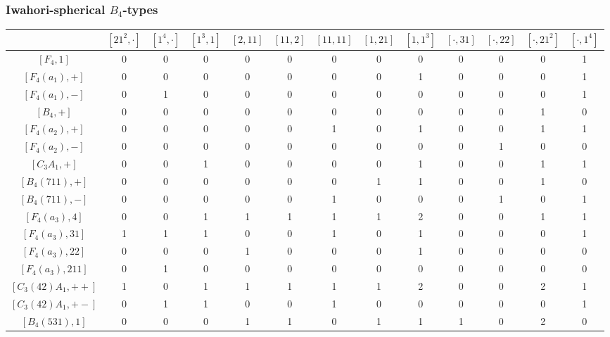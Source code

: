 \begin{landscape}
    \centering
    \subsubsection*{Iwahori-spherical \texorpdfstring{$B_4$}{PDFstring}-types}
    \begin{table}[ht]
        \centering
        {\small
        \begin{tabular}{|c|cccccccccccc|}
            \hline
            & $[21^2,\cdot]$ & $[1^4,\cdot]$ & $[1^3,1]$ & $[2,11]$ & $[11,2]$ & $[11,11]$ & $[1,21]$ & $[1,1^3]$ & $[\cdot,31]$ & $[\cdot,22]$ & $[\cdot,21^2]$ & $[\cdot,1^4]$ \\\hline
            $[F_4,1]$ & 0 & 0 & 0 & 0 & 0 & 0 & 0 & 0 & 0 & 0 & 0 & 1\\\hline
            $[F_4(a_1),+]$ & 0 & 0 & 0 & 0 & 0 & 0 & 0 & 1 & 0 & 0 & 0 & 1\\
            $[F_4(a_1),-]$ & 0 & 1 & 0 & 0 & 0 & 0 & 0 & 0 & 0 & 0 & 0 & 1\\
            $[B_4,+]$ & 0 & 0 & 0 & 0 & 0 & 0 & 0 & 0 & 0 & 0 & 1 & 0\\\hline
            $[F_4(a_2),+]$ & 0 & 0 & 0 & 0 & 0 & 1 & 0 & 1 & 0 & 0 & 1 & 1\\
            $[F_4(a_2),-]$ & 0 & 0 & 0 & 0 & 0 & 0 & 0 & 0 & 0 & 1 & 0 & 0\\
            $[C_3A_1,+]$ & 0 & 0 & 1 & 0 & 0 & 0 & 0 & 1 & 0 & 0 & 1 & 1\\\hline
            $[B_4(711),+]$ & 0 & 0 & 0 & 0 & 0 & 0 & 1 & 1 & 0 & 0 & 1 & 0\\
            $[B_4(711),-]$ & 0 & 0 & 0 & 0 & 0 & 1 & 0 & 0 & 0 & 1 & 0 & 1\\\hline
            $[F_4(a_3),4]$ & 0 & 0 & 1 & 1 & 1 & 1 & 1 & 2 & 0 & 0 & 1 & 1\\
            $[F_4(a_3),31]$ & 1 & 1 & 1 & 0 & 0 & 1 & 0 & 1 & 0 & 0 & 0 & 1 \\
            $[F_4(a_3),22]$ & 0 & 0 & 0 & 1 & 0 & 0 & 0 & 1 & 0 & 0 & 0 & 0 \\
            $[F_4(a_3),211]$ & 0 & 1 & 0 & 0 & 0 & 0 & 0 & 0 & 0 & 0 & 0 & 0 \\
            $[C_3(42)A_1,++]$ & 1 & 0 & 1 & 1 & 1 & 1 & 1 & 2 & 0 & 0 & 2 & 1 \\
            $[C_3(42)A_1,+-]$ & 0 & 1 & 1 & 0 & 0 & 1 & 0 & 0 & 0 & 0 & 0 & 1 \\
            $[B_4(531),1]$ & 0 & 0 & 0 & 1 & 1 & 0 & 1 & 1 & 1 & 0 & 2 & 0 \\

\end{tabular}}
\end{table}
\end{landscape}

